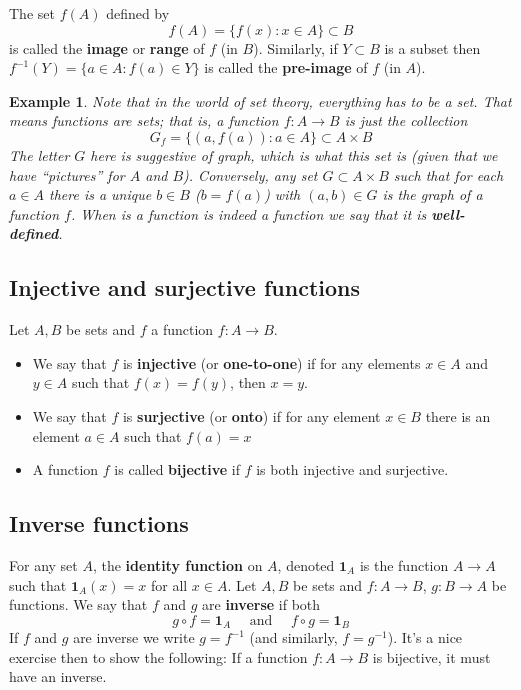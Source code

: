 \documentclass[12pt]{article}
\numberwithin{equation}{subsection}
\theoremstyle{note}
\newtheorem{example}[subsection]{Example}
\begin{document}
The set $f(A)$ defined by \[f(A)=\{ f(x) : x\in A\} \subset B\] is called the \textbf{image} or \textbf{range} of $f$ (in $B$). Similarly, if $Y\subset B$ is a subset then $f^{-1}(Y)=\{a\in A: f(a)\in Y\}$ is called the \textbf{pre-image} of $f$ (in $A$).

\begin{example} Note that in the world of set theory, everything has to be a set. That means functions are sets; that is,  a function $f\colon A\to B$ is just the collection \begin{equation} G_f= \{ (a,f(a)) : a\in A\} \subset A\times B\end{equation} The letter $G$ here is suggestive of graph, which is what this set is (given that we have ``pictures'' for $A$ and $B$). Conversely, any set $G\subset A\times B$ such that for each $a\in A$ there is a unique $b\in B$ ($b=f(a)$) with $(a,b)\in G$ is the graph of a function $f$. When is a function is indeed a function we say that it is \textbf{well-defined}.
\end{example}


\subsection{Injective and surjective functions} Let $A, B$ be sets and $f$ a function $f\colon A\to B$.
\begin{itemize}
	\item We say that $f$ is \textbf{injective} (or \textbf{one-to-one}) if for any elements $x\in A$ and $y\in A$ such that $f(x)=f(y)$, then $x=y$. 
	\item We say that $f$ is \textbf{surjective} (or \textbf{onto}) if for any element $x\in B$ there is an element $a\in A$ such that $f(a)=x$
	\item A function $f$ is called \textbf{bijective} if $f$ is both injective and surjective. 
\end{itemize}

\subsection{Inverse functions} For any set $A$, the \textbf{identity function} on $A$, denoted $\mathbf{1}_A$ is the function $A\to A$ such that $\mathbf{1}_A(x)=x$ for all $x\in A$. Let $A,B$ be sets and $f\colon A\to B$, $g\colon B\to A$ be functions. We say that $f$ and $g$ are \textbf{inverse} if both \[ g\circ f = \mathbf{1}_A \quad \text{ and } \quad f\circ g = \mathbf{1}_B\] 
If $f$ and $g$ are inverse we write $g=f^{-1}$ (and similarly, $f=g^{-1}$). It's a nice exercise then to show the following: If a function $f\colon A\to B$ is bijective, it must have an inverse. 
\end{document}
